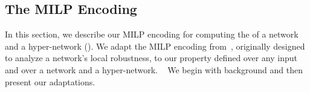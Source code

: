 \subsection{The MILP Encoding} 
\label{sec:our_approach_milp} 
In this section, we describe our MILP encoding for computing the \propa of a network and a hyper-network (). %
We adapt the MILP encoding from~\citet{ref_42}, originally designed to analyze a network's local robustness, to our property defined over any input and over a network and a hyper-network. 
\
We begin with background and then present our adaptations. 

